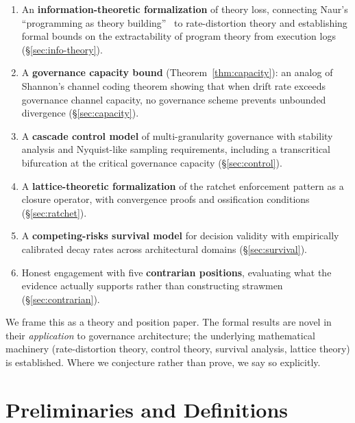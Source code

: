 \documentclass[11pt, a4paper, copyright]{googledeepmind}
\begin{document}
\begin{enumerate}
    \item An \textbf{information-theoretic formalization} of theory loss, connecting Naur's ``programming as theory building''~\citep{naur1985} to rate-distortion theory and establishing formal bounds on the extractability of program theory from execution logs (\S\ref{sec:info-theory}).

    \item A \textbf{governance capacity bound} (Theorem~\ref{thm:capacity}): an analog of Shannon's channel coding theorem showing that when drift rate exceeds governance channel capacity, no governance scheme prevents unbounded divergence (\S\ref{sec:capacity}).

    \item A \textbf{cascade control model} of multi-granularity governance with stability analysis and Nyquist-like sampling requirements, including a transcritical bifurcation at the critical governance capacity (\S\ref{sec:control}).

    \item A \textbf{lattice-theoretic formalization} of the ratchet enforcement pattern as a closure operator, with convergence proofs and ossification conditions (\S\ref{sec:ratchet}).

    \item A \textbf{competing-risks survival model} for decision validity with empirically calibrated decay rates across architectural domains (\S\ref{sec:survival}).

    \item Honest engagement with five \textbf{contrarian positions}, evaluating what the evidence actually supports rather than constructing strawmen (\S\ref{sec:contrarian}).
\end{enumerate}

We frame this as a theory and position paper. The formal results are novel in their \emph{application} to governance architecture; the underlying mathematical machinery (rate-distortion theory, control theory, survival analysis, lattice theory) is established. Where we conjecture rather than prove, we say so explicitly.


\section{Preliminaries and Definitions}
\label{sec:prelim}
\end{document}
